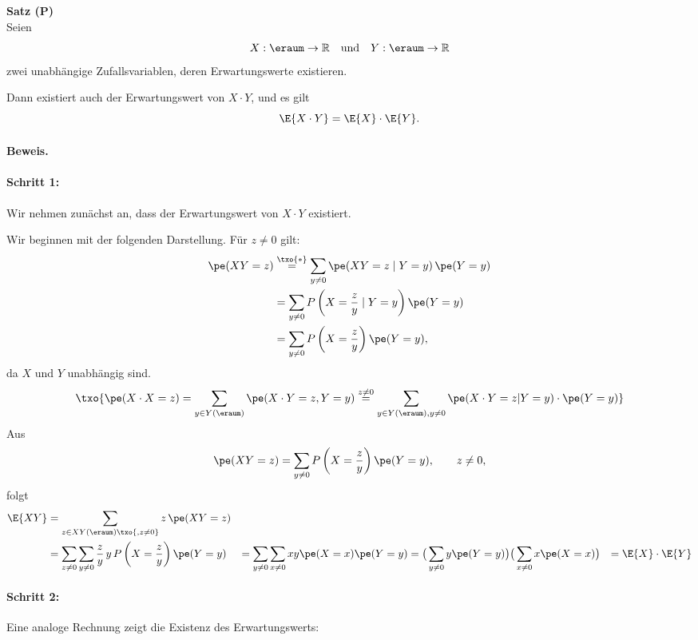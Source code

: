 \begin{satz}
    \textbf{Satz (P)}   \\
    Seien
    \[
        X:\eraum\to\mathbb{R}
        \quad\text{und}\quad
        Y:\eraum\to\mathbb{R}
    \]
    zwei unabhängige Zufallsvariablen, deren Erwartungswerte existieren.

    Dann existiert auch der Erwartungswert von \(X\cdot Y\), und es gilt
    \[
        \E{X\cdot Y}
        =
        \E{X}\cdot\E{Y}.
    \]

    \paragraph{Beweis.}

    \paragraph{Schritt 1:}
    Wir nehmen zunächst an, dass der Erwartungswert von \(X\cdot Y\) existiert.

    Wir beginnen mit der folgenden Darstellung.
    Für \(z\neq 0\) gilt: 
    \[
        \begin{aligned}
            \pe(XY=z)
            & \overset{\txo{*}}{=}
            \sum_{y\neq 0}
            \pe(XY=z\mid Y=y)\,\pe(Y=y)
            \\
            &=
            \sum_{y\neq 0}
            P\left(X=\frac{z}{y}\mid Y=y\right)
            \pe(Y=y)
            \\
            &=
            \sum_{y\neq 0}
            P\left(X=\frac{z}{y}\right)
            \pe(Y=y),
        \end{aligned}
    \]
    da \(X\) und \(Y\) unabhängig sind.
    \[
        \txo{
            \pe(X \cdot X = z) = \sum_{y \in Y(\eraum)} \pe(X \cdot Y = z, Y = y) \overset{z \neq 0}{=} \sum_{y \in Y(\eraum), y \neq 0} \pe(X \cdot Y = z| Y = y) \cdot \pe(Y=y)
        }
    \]
    Aus
    \[
        \pe(XY=z)
        =
        \sum_{y\neq 0}
        P\left(X=\frac{z}{y}\right)
        \pe(Y=y),
        \qquad z\neq 0,
    \]
    folgt
    \[
        \begin{aligned}
            \E{XY}
            &=
            \sum_{z\in XY(\eraum)\txo{, z \neq 0}}
            z\,\pe(XY=z)
            \\
            &=
            \sum_{z\neq 0}
            \sum_{y\neq 0}
            \frac{z}{y}\,y\,
            P\left(X=\frac{z}{y}\right)
            \pe(Y=y)
            &=
            \sum_{y\neq 0}
            \sum_{x\neq 0}
            xy \pe(X=x) \pe(Y=y)
            &=
            \big(
                    \sum_{y\neq 0} y \pe(Y=y)
                    \big)
            \big(
                    \sum_{x\neq 0} x \pe(X=x)
                    \big)
            &=
            \E{X} \cdot \E{Y}
        \end{aligned}
    \]

    \paragraph{Schritt 2:} Eine analoge Rechnung zeigt die Existenz des Erwartungswerts:
\end{satz}
